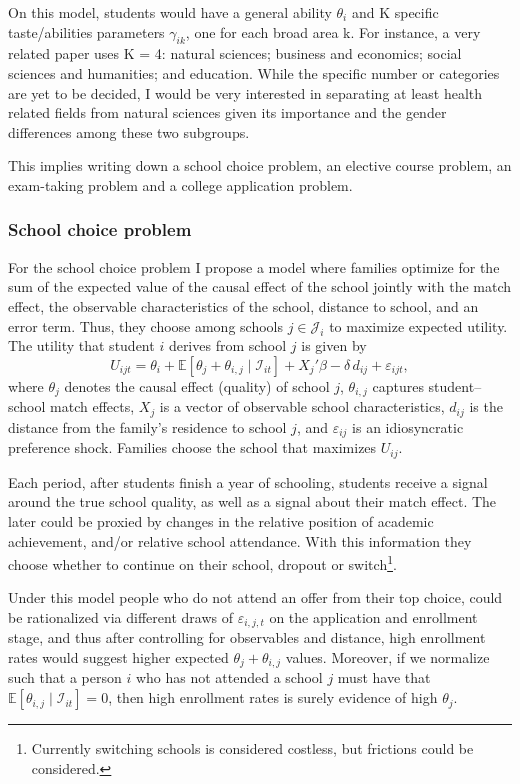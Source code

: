 \documentclass[12pt]{article}
\begin{document}
On this model, students would have a general ability $\theta_i$ and K specific taste/abilities parameters $\gamma_{ik}$, one for each broad area k. For instance,  \textcite{arcidiacono_ability_2004} a very related paper uses K = 4: natural sciences; business and economics; social sciences and humanities; and education. While the specific number or categories are yet to be decided, I would be very interested in separating at least health related fields from natural sciences given its importance and the gender differences among these two subgroups.


This implies writing down a school choice problem, an elective course problem, an exam-taking problem and a college application problem. 

\subsubsection{School choice problem}

For the school choice problem I propose a model where families optimize for the sum of the expected value of the causal effect of the school jointly with the match effect, the observable characteristics of the school, distance to school, and an error term. Thus, they choose 
among schools
\(j \in \mathcal{J}_i\) to maximize expected utility. The utility that student
\(i\) derives from school \(j\) is given by
\[
U_{ijt}
= \theta_i+ \mathbb{E}\!\left[\theta_j + \theta_{i,j} \mid \mathcal{I}_{it} \right]
+ X_j'\beta
- \delta \, d_{ij}
+ \varepsilon_{ijt},
\]
where \(\theta_j\) denotes the causal effect (quality) of school \(j\),
\(\theta_{i,j}\) captures student--school match effects, \(X_j\) is a vector
of observable school characteristics, \(d_{ij}\) is the distance from the
family’s residence to school \(j\), and \(\varepsilon_{ij}\) is an
idiosyncratic preference shock. Families choose the school that maximizes
\(U_{ij}\).


Each period, after students finish a year of schooling, students receive a signal around the true school quality, as well as a signal about their match effect. The later could be proxied by changes in the relative position of academic achievement, and/or relative school attendance. With this information they choose whether to continue on their school, dropout or switch\footnote{Currently switching schools is considered costless, but frictions could be considered. }.

Under this model people who do not attend an offer from their top choice, could be rationalized via different draws of $\varepsilon_{i,j,t}$ on the application and enrollment stage, and thus after controlling for observables and distance, high enrollment rates would suggest higher expected $\theta_j + \theta_{i,j}$ values. Moreover, if we normalize such that a person  $i$ who has not attended a school $j$ must have that $ \mathbb{E}\!\left[ \theta_{i,j}  \mid \mathcal{I}_{it} \right] = 0$, then high enrollment rates is surely evidence of high $\theta_j$.
\end{document}
